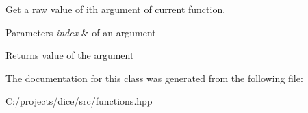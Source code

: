 Get a raw value of ith argument of current function. 


\begin{DoxyParams}{Parameters}
{\em index} & of an argument\\
\hline
\end{DoxyParams}
\begin{DoxyReturn}{Returns}
value of the argument 
\end{DoxyReturn}


The documentation for this class was generated from the following file\+:\begin{DoxyCompactItemize}
\item 
C\+:/projects/dice/src/functions.\+hpp\end{DoxyCompactItemize}
